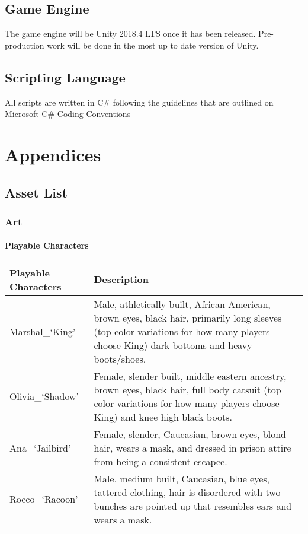 \documentclass[10pt]{report}
\begin{document}
\section{Game Engine}

The game engine will be Unity 2018.4 LTS once it has been released. Pre-production work will be done in the most up to date version of Unity.

\section{Scripting Language}

All scripts are written in C\# following the guidelines that are outlined on Microsoft C\# Coding Conventions

\chapter{Appendices}

\section{Asset List}

\subsection{Art}

\subsubsection{Playable Characters}

\begin{center}
    \begin{tabular}{| p{.45\linewidth} | p{.45\linewidth}|} 
        \hline
        Playable Characters & Description \\ \hline
        Marshal\_`King'  &   Male, athletically built, African American, brown eyes, black hair, primarily long sleeves (top color variations for how many players choose King) dark bottoms and heavy boots/shoes.  \\ \hline
        Olivia\_`Shadow' &   Female, slender built, middle eastern ancestry, brown eyes, black hair, full body catsuit (top color variations for how many players choose King) and knee high black boots.  \\ \hline
        Ana\_`Jailbird'  &   Female, slender, Caucasian, brown eyes, blond hair, wears a mask, and dressed in prison attire from being a consistent escapee.  \\ \hline
        Rocco\_`Racoon'  &   Male, medium built, Caucasian, blue eyes, tattered clothing, hair is disordered with two bunches are pointed up that resembles ears and wears a mask.  \\
        \hline
    \end{tabular}
\end{center}
    
\end{document}
